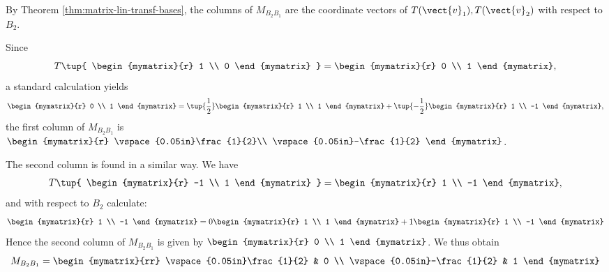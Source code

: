 \begin{solution}
By Theorem \ref{thm:matrix-lin-transf-bases}, the columns of $M_{B_{2} B_{1}}$ are the
coordinate vectors of $T(\vect{v}_{1}), T(\vect{v}_{2})$ with respect
to $B_2$.

Since \[
T \tup{
\begin{mymatrix}{r}
1 \\
0
\end{mymatrix} }
= \begin{mymatrix}{r}
0 \\
1
\end{mymatrix} ,\]
a standard calculation yields 
\[
 \begin{mymatrix}{r}
0 \\
1
\end{mymatrix} 
 =  
\tup{\frac{1}{2} }\begin{mymatrix}{r}
1 \\
1
\end{mymatrix}
+
\tup{-\frac{1}{2} }
\begin{mymatrix}{r}
1 \\
-1
\end{mymatrix},
\]
the first column of $M_{B_{2} B_{1}}$ is $\begin{mymatrix}{r}
\vspace{0.05in}\frac{1}{2}\\
\vspace{0.05in}-\frac{1}{2}
\end{mymatrix}$. 

The second column is found in a similar way. We have 
\[
T \tup{
\begin{mymatrix}{r}
-1 \\
1
\end{mymatrix} }
= \begin{mymatrix}{r}
1 \\
-1
\end{mymatrix} , \]
and with respect to $B_2$ calculate:
\[ 
\begin{mymatrix}{r}
1 \\
-1
\end{mymatrix}
=
0 \begin{mymatrix}{r}
1 \\
1
\end{mymatrix}
+
1
\begin{mymatrix}{r}
1 \\
-1
\end{mymatrix}
\]
Hence the second column of $M_{B_{2} B_{1}}$ is given by $\begin{mymatrix}{r}
0 \\
1
\end{mymatrix}$. We thus obtain 
\[
M_{B_{2} B_{1}} = \begin{mymatrix}{rr}
\vspace{0.05in}\frac{1}{2} & 0 \\
\vspace{0.05in}-\frac{1}{2} & 1 
\end{mymatrix} \]


\end{solution}
